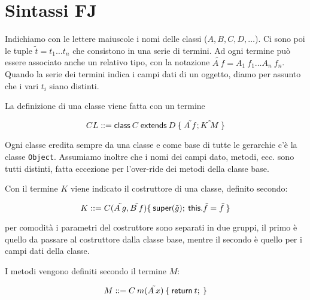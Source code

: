 

\section{Sintassi FJ}

Indichiamo con le lettere maiuscole i nomi delle classi ($A, B, C, D, \ldots$). 
Ci sono poi le tuple $\tilde{t} = t_1 \ldots t_n$ che consistono in una serie di termini. Ad ogni termine può essere associato anche un relativo tipo, con la notazione $\tilde{A\: f} = A_1 \: f_1 \ldots A_n \: f_n$.
Quando la serie dei termini indica i campi dati di un oggetto, diamo per assunto che i vari $t_i$ siano distinti.

La definizione di una classe viene fatta con un termine

$$
CL ::= \class{C}{D}{\tilde{A \: f}; \tilde{K \: M}}
$$

\noindent Ogni classe eredita sempre da una classe e come base di tutte le gerarchie c'è la classe \texttt{Object}. Assumiamo inoltre che i nomi dei campi dato, metodi, ecc. sono tutti distinti, fatta eccezione per l'over-ride dei metodi della classe base.

Con il termine $K$ viene indicato il costruttore di una classe, definito secondo:

$$
K ::= \construct{C}{\tilde{A\:g}, \tilde{B\:f}}{\super (\tilde{g}) ; \: \this.\tilde{f} = \tilde{f}}
$$

\noindent per comodità i parametri del costruttore sono separati in due gruppi, il primo è quello da passare al costruttore dalla classe base, mentre il secondo è quello per i campi dati della classe.

I metodi vengono definiti secondo il termine $M$:

$$
M ::= \method{C}{m}{\tilde{A \: x}}{t}
$$

